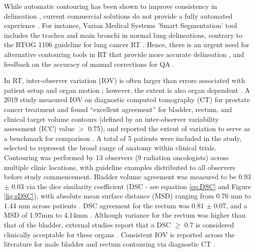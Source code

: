 While automatic contouring has been shown to improve consistency in delineation \cite{Vinod_2016}, current commercial solutions do not provide a fully automated experience \cite{Nemoto_2020}. For instance, Varian Medical Systems 'Smart Segmentation' tool includes the trachea and main bronchi in normal lung delineations, contrary to the RTOG 1106 guideline for lung cancer RT \cite{Nemoto_2020}. Hence, there is an urgent need for alternative contouring tools in RT that provide more accurate delineation \cite{Nemoto_2020}, and feedback on the accuracy of manual corrections for QA \cite{Nikolov_2018}.

In RT, inter-observer variation (IOV) is often larger than errors associated with patient setup and organ motion \cite{Vinod_2016, Murakami2013}; however, the extent is also organ dependent \cite{Roach_2019}. A 2019 study measured IOV on diagnostic computed tomography (CT) for prostate cancer treatment and found ``excellent agreement'' for bladder, rectum, and clinical target volume contours (defined by an inter-observer variability assessment (ICC) value $>$ 0.75), and reported the extent of variation to serve as a benchmark for comparison \cite{Roach_2019}.  A total of 5 patients were included in the study, selected to represent the broad range of anatomy within clinical trials. Contouring was performed by 13  observers (9 radiation oncologists) across multiple clinic locations, with guideline examples distributed to all observers before study commencement. Bladder volume agreement was measured to be 0.93 $\pm$ 0.03 via the dice similarity coefficient (DSC \cite{Dice1945} - see equation \ref{eq:DSC} and Figure \ref{fig:sDSC}), with absolute mean surface distance (MSD) ranging from 0.76 mm to 1.44 mm across patients \cite{Roach_2019}. DSC agreement for the rectum was  0.81 $\pm$ 0.07, and a MSD of 1.97mm to 4.14mm \cite{Roach_2019}. Although variance for the rectum was higher than that of the bladder, external studies report that a DSC $\geq$ 0.7 is considered clinically acceptable for these organs \cite{Roach_2019, Sharp2014}. Consistent IOV is reported across the literature for male bladder and rectum contouring via diagnostic CT \cite{Riegal2016}.

